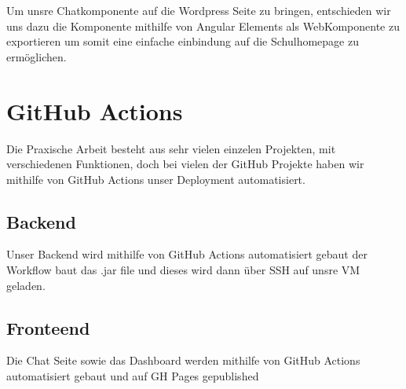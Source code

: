 Um unsre Chatkomponente auf die Wordpress Seite zu bringen, entschieden wir uns dazu die Komponente mithilfe von Angular Elements als WebKomponente zu exportieren um somit eine einfache einbindung auf die Schulhomepage zu ermöglichen.

\section{GitHub Actions}

Die Praxische Arbeit besteht aus sehr vielen einzelen Projekten, mit verschiedenen Funktionen, doch bei vielen der GitHub Projekte haben wir mithilfe von GitHub Actions unser Deployment automatisiert.

\subsection{Backend}

Unser Backend wird mithilfe von GitHub Actions automatisiert gebaut der Workflow baut das .jar file und dieses wird dann über SSH auf unsre VM geladen.

\subsection{Fronteend}
Die Chat Seite sowie das Dashboard werden mithilfe von GitHub Actions automatisiert gebaut und auf GH Pages gepublished
